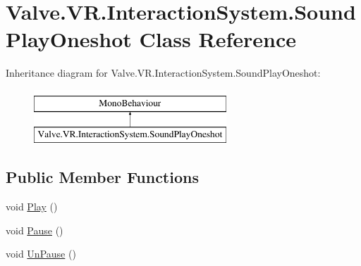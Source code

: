 \hypertarget{class_valve_1_1_v_r_1_1_interaction_system_1_1_sound_play_oneshot}{}\section{Valve.\+V\+R.\+Interaction\+System.\+Sound\+Play\+Oneshot Class Reference}
\label{class_valve_1_1_v_r_1_1_interaction_system_1_1_sound_play_oneshot}
Inheritance diagram for Valve.\+V\+R.\+Interaction\+System.\+Sound\+Play\+Oneshot\+:\begin{figure}[H]
\begin{center}
\leavevmode
\includegraphics[height=2.000000cm]{class_valve_1_1_v_r_1_1_interaction_system_1_1_sound_play_oneshot}
\end{center}
\end{figure}
\subsection*{Public Member Functions}
\begin{DoxyCompactItemize}
\item 
void \mbox{\hyperlink{class_valve_1_1_v_r_1_1_interaction_system_1_1_sound_play_oneshot_add1324a91d31e0d4e252a3e109425363}{Play}} ()
\item 
void \mbox{\hyperlink{class_valve_1_1_v_r_1_1_interaction_system_1_1_sound_play_oneshot_adcfbbd0db7e01bf3141d24c17d13aa32}{Pause}} ()
\item 
void \mbox{\hyperlink{class_valve_1_1_v_r_1_1_interaction_system_1_1_sound_play_oneshot_a7721ec772f8e42cd8dc2214e785eeebe}{Un\+Pause}} ()
\end{DoxyCompactItemize}
